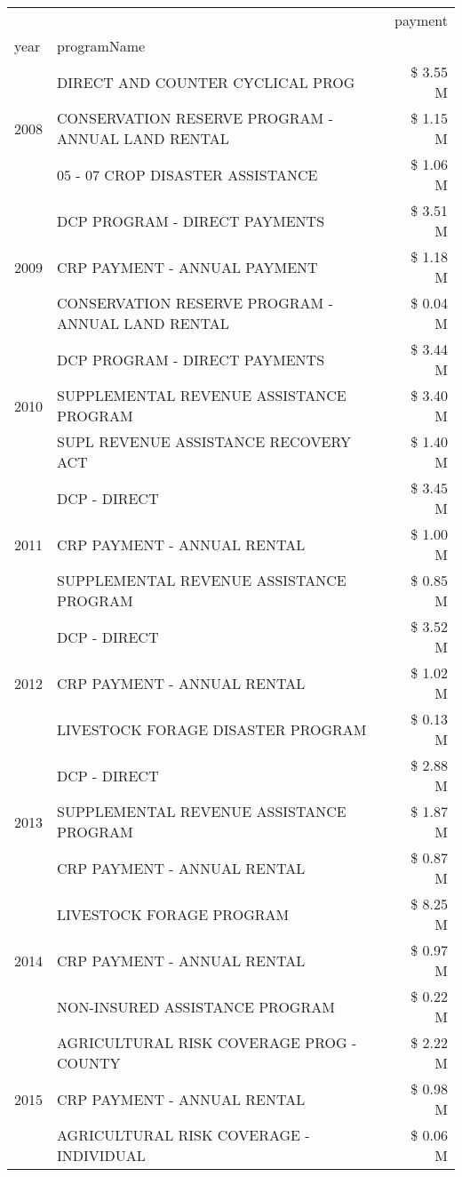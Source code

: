 \begin{tabular}{llr}
\toprule
 &  & payment \\
year & programName &  \\
\midrule
\multirow[t]{3}{*}{2008} & DIRECT AND COUNTER CYCLICAL PROG & \$ 3.55 M \\
 & CONSERVATION RESERVE PROGRAM - ANNUAL LAND RENTAL & \$ 1.15 M \\
 & 05 - 07 CROP DISASTER ASSISTANCE & \$ 1.06 M \\
\cline{1-3}
\multirow[t]{3}{*}{2009} & DCP PROGRAM - DIRECT PAYMENTS & \$ 3.51 M \\
 & CRP PAYMENT - ANNUAL PAYMENT & \$ 1.18 M \\
 & CONSERVATION RESERVE PROGRAM - ANNUAL LAND RENTAL & \$ 0.04 M \\
\cline{1-3}
\multirow[t]{3}{*}{2010} & DCP PROGRAM - DIRECT PAYMENTS & \$ 3.44 M \\
 & SUPPLEMENTAL REVENUE ASSISTANCE PROGRAM & \$ 3.40 M \\
 & SUPL REVENUE ASSISTANCE RECOVERY ACT & \$ 1.40 M \\
\cline{1-3}
\multirow[t]{3}{*}{2011} & DCP - DIRECT & \$ 3.45 M \\
 & CRP PAYMENT - ANNUAL RENTAL & \$ 1.00 M \\
 & SUPPLEMENTAL REVENUE ASSISTANCE PROGRAM & \$ 0.85 M \\
\cline{1-3}
\multirow[t]{3}{*}{2012} & DCP - DIRECT & \$ 3.52 M \\
 & CRP PAYMENT - ANNUAL RENTAL & \$ 1.02 M \\
 & LIVESTOCK FORAGE DISASTER PROGRAM & \$ 0.13 M \\
\cline{1-3}
\multirow[t]{3}{*}{2013} & DCP - DIRECT & \$ 2.88 M \\
 & SUPPLEMENTAL REVENUE ASSISTANCE PROGRAM & \$ 1.87 M \\
 & CRP PAYMENT - ANNUAL RENTAL & \$ 0.87 M \\
\cline{1-3}
\multirow[t]{3}{*}{2014} & LIVESTOCK FORAGE PROGRAM & \$ 8.25 M \\
 & CRP PAYMENT - ANNUAL RENTAL & \$ 0.97 M \\
 & NON-INSURED ASSISTANCE PROGRAM & \$ 0.22 M \\
\cline{1-3}
\multirow[t]{3}{*}{2015} & AGRICULTURAL RISK COVERAGE PROG - COUNTY & \$ 2.22 M \\
 & CRP PAYMENT - ANNUAL RENTAL & \$ 0.98 M \\
 & AGRICULTURAL RISK COVERAGE - INDIVIDUAL & \$ 0.06 M \\

\end{tabular}
